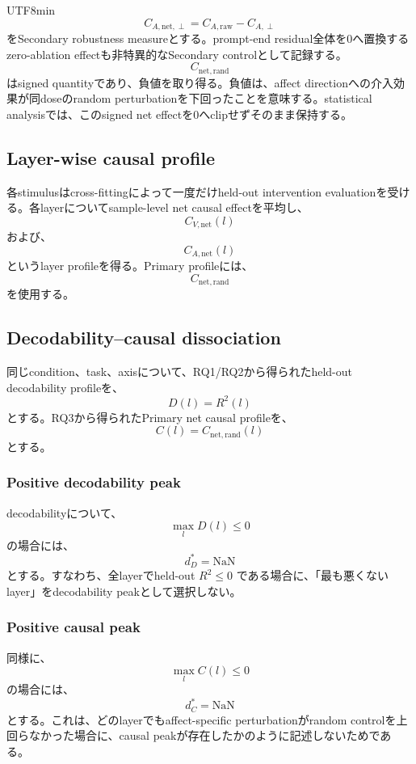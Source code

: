 \documentclass{article} %
\begin{document}
\begin{CJK*}{UTF8}{min}
\[
C_{A,\mathrm{net,\perp}}
=
C_{A,\mathrm{raw}}
-
C_{A,\perp}
\]
をSecondary robustness measureとする。prompt-end residual全体を0へ置換する
zero-ablation effectも非特異的なSecondary controlとして記録する。
\[
C_{\mathrm{net,rand}}
\]
はsigned quantityであり、負値を取り得る。負値は、affect directionへの介入効果が同doseのrandom perturbationを下回ったことを意味する。statistical analysisでは、このsigned net effectを0へclipせずそのまま保持する。


\subsection{Layer-wise causal profile}

各stimulusはcross-fittingによって一度だけheld-out intervention evaluationを受ける。各layerについてsample-level net causal effectを平均し、
\[
C_{V,\mathrm{net}}(l)
\]
および、
\[
C_{A,\mathrm{net}}(l)
\]
というlayer profileを得る。Primary profileには、
\[
C_{\mathrm{net,rand}}
\]
を使用する。


\subsection{Decodability--causal dissociation}

同じcondition、task、axisについて、RQ1/RQ2から得られたheld-out decodability profileを、
\[
D(l)
=
R^2(l)
\]
とする。RQ3から得られたPrimary net causal profileを、
\[
C(l)
=
C_{\mathrm{net,rand}}(l)
\]
とする。


\subsubsection{Positive decodability peak}

decodabilityについて、
\[
\max_lD(l)\le0
\]
の場合には、
\[
d_D^{*}
=
\mathrm{NaN}
\]
とする。すなわち、全layerでheld-out \(R^2\le0\) である場合に、「最も悪くないlayer」をdecodability peakとして選択しない。


\subsubsection{Positive causal peak}

同様に、
\[
\max_l C(l)\le0
\]
の場合には、
\[
d_C^{*}
=
\mathrm{NaN}
\]
とする。これは、どのlayerでもaffect-specific perturbationがrandom controlを上回らなかった場合に、causal peakが存在したかのように記述しないためである。



\end{CJK*}
\end{document}

